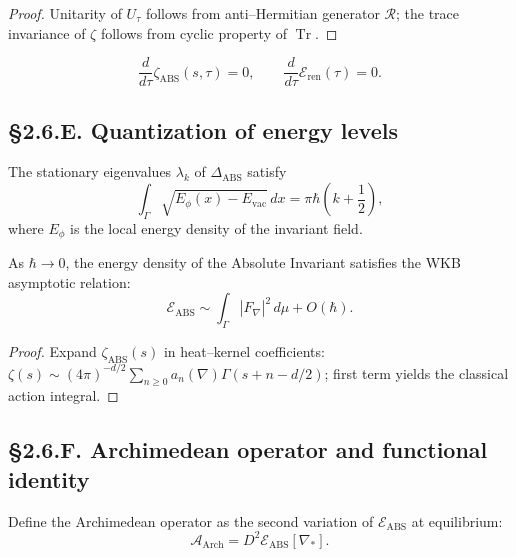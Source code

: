 \begin{proof}
Unitarity of $U_\tau$ follows from anti–Hermitian generator $\mathcal{R}$; the trace invariance of $\zeta$ follows from cyclic property of $\operatorname{Tr}$.
\end{proof}

\begin{corollary}
\[
\frac{d}{d\tau}\zeta_{\mathrm{ABS}}(s,\tau)=0,\qquad
\frac{d}{d\tau}\mathcal{E}_{\mathrm{ren}}(\tau)=0.
\]
\end{corollary}

\subsection*{§2.6.E. Quantization of energy levels}

\begin{definition}
The stationary eigenvalues $\lambda_k$ of $\Delta_{\mathrm{ABS}}$ satisfy
\[
\int_{\Gamma}\sqrt{E_\phi(x)-E_{\mathrm{vac}}}\,dx = \pi\hbar\left(k+\frac{1}{2}\right),
\]
where $E_\phi$ is the local energy density of the invariant field.
\end{definition}

\begin{theorem}\label{thm:2.6.wkb}
As $\hbar\to0$, the energy density of the Absolute Invariant satisfies the WKB asymptotic relation:
\[
\mathcal{E}_{\mathrm{ABS}}
\sim \int_\Gamma |F_\nabla|^2\,d\mu + O(\hbar).
\]
\]
\end{theorem}

\begin{proof}
Expand $\zeta_{\mathrm{ABS}}(s)$ in heat–kernel coefficients:
$\zeta(s)\sim (4\pi)^{-d/2}\sum_{n\ge0} a_n(\nabla)\Gamma(s+n-d/2)$; first term yields the classical action integral.
\end{proof}

\subsection*{§2.6.F. Archimedean operator and functional identity}

\begin{definition}
Define the Archimedean operator as the second variation of $\mathcal{E}_{\mathrm{ABS}}$ at equilibrium:
\[
\mathcal{A}_{\mathrm{Arch}} = D^2\mathcal{E}_{\mathrm{ABS}}[\nabla_\ast].
\]
\end{definition}

